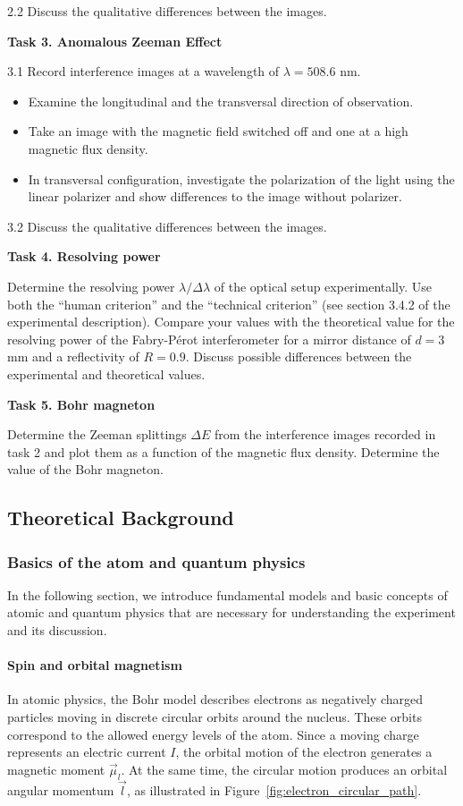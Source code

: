 \documentclass{article}
\begin{document}
2.2 Discuss the qualitative differences between the images.

\textbf{Task 3. Anomalous Zeeman Effect}

3.1 Record interference images at a wavelength of $\lambda = 508.6$ nm.
\begin{itemize}
    \item Examine the longitudinal and the transversal direction of observation.
    \item Take an image with the magnetic field switched off and one at a high magnetic flux density.
    \item  In transversal configuration, investigate the polarization of the light using the linear polarizer and show differences to the image without polarizer.
\end{itemize}

3.2 Discuss the qualitative differences between the images.

\textbf{Task 4. Resolving power}

Determine the resolving power $\lambda/\Delta\lambda$ of the optical setup experimentally. Use both the ``human criterion'' and the ``technical criterion'' (see section 3.4.2 of the experimental description). Compare your values with
the theoretical value for the resolving power of the Fabry-Pérot interferometer for a mirror
distance of $d = 3$ mm and a reflectivity of $R = 0.9$. Discuss possible differences between the
experimental and theoretical values.

\textbf{Task 5. Bohr magneton}

Determine the Zeeman splittings $\Delta E$ from the interference images recorded in task 2 and plot
them as a function of the magnetic flux density. Determine the value of the Bohr magneton.



\subsection{Theoretical Background}

\subsubsection{Basics of the atom and quantum physics}
In the following section, we introduce fundamental models and basic concepts of atomic and quantum physics that are necessary for understanding the experiment and its discussion.

\paragraph{Spin and orbital magnetism}
In atomic physics, the Bohr model describes electrons as negatively charged particles moving in discrete circular orbits around the nucleus. These orbits correspond to the allowed energy levels of the atom. Since a moving charge represents an electric current $I$, the orbital motion of the electron generates a magnetic moment $\vec{\mu}_l$. At the same time, the circular motion produces an orbital angular momentum $\vec{l}$, as illustrated in Figure~\ref{fig:electron_circular_path}.
\end{document}

